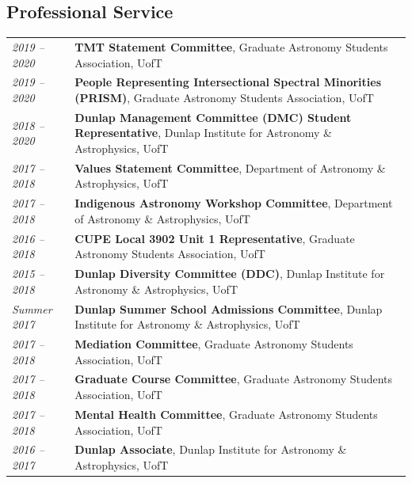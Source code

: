 \documentclass[10pt]{res} %
\begin{document}
\begin{resume}

\section{\Large Professional Service}
\vspace{-5pt} %
\noindent\makebox[\linewidth]{\rule{\textwidth}{0.4pt}}
\vspace{-20pt} %

\begin{table}[h]
\begin{tabularx}{\textwidth}{lX}
\textit{2019 -- 2020} & \textbf{TMT Statement Committee}, Graduate Astronomy Students Association, UofT \\
\textit{2019 -- 2020} & \textbf{People Representing Intersectional Spectral Minorities (PRISM)}, Graduate Astronomy Students Association, UofT \\
\textit{2018 -- 2020} & \textbf{Dunlap Management Committee (DMC) Student Representative}, Dunlap Institute for Astronomy \& Astrophysics, UofT \\
\textit{2017 -- 2018} & \textbf{Values Statement Committee}, Department of Astronomy \& Astrophysics, UofT \\
\textit{2017 -- 2018} & \textbf{Indigenous Astronomy  Workshop Committee}, Department of Astronomy \& Astrophysics, UofT \\
\textit{2016 --  2018} & \textbf{CUPE Local 3902 Unit 1 Representative}, Graduate Astronomy Students Association, UofT \\
\textit{2015 --  2018} & \textbf{Dunlap Diversity Committee (DDC)}, Dunlap Institute for Astronomy \& Astrophysics, UofT \\
\textit{Summer 2017} & \textbf{Dunlap Summer School Admissions Committee}, Dunlap Institute for Astronomy \& Astrophysics, UofT \\
\textit{2017 -- 2018} & \textbf{Mediation Committee}, Graduate Astronomy Students Association, UofT \\
\textit{2017 -- 2018} & \textbf{Graduate Course Committee}, Graduate Astronomy Students Association, UofT \\
\textit{2017 -- 2018} & \textbf{Mental Health Committee}, Graduate Astronomy Students Association, UofT \\
\textit{2016 --  2017} & \textbf{Dunlap Associate}, Dunlap Institute for Astronomy \& Astrophysics, UofT
\end{tabularx}
\end{table}


\end{resume}
\end{document}
